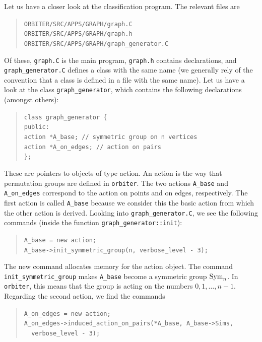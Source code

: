 Let us have a closer look at the classification program. The relevant 
files are
\begin{quote}
\verb'ORBITER/SRC/APPS/GRAPH/graph.C'\\
\verb'ORBITER/SRC/APPS/GRAPH/graph.h'\\
\verb'ORBITER/SRC/APPS/GRAPH/graph_generator.C'\\
\end{quote}
Of these, \verb'graph.C' is the main program, \verb'graph.h' contains declarations, 
and \verb'graph_generator.C' defines a class with the same name (we generally 
rely of the convention that a class is defined in a file with the same name).
Let us have a look at the class \verb'graph_generator', which contains the following 
declarations (amongst others):
\begin{quote}
\verb'class graph_generator {'\\
\verb'public:'\\
  \verb'action *A_base; // symmetric group on n vertices'\\
  \verb'action *A_on_edges; // action on pairs'\\
\verb'};'\\
\end{quote}
These are pointers to objects of type action. 
An action is the way that permutation groups are defined in \verb'orbiter'.
The two actions \verb'A_base' and \verb'A_on_edges' correspond to the action on points 
and on edges, respectively. The first action is called \verb'A_base' because we consider this the basic action from which the other action is derived.
Looking into \verb'graph_generator.C', we see the following commands (inside the function \verb'graph_generator::init'):
\begin{quote}
\verb'A_base = new action;'\\
\verb'A_base->init_symmetric_group(n, verbose_level - 3);'\\
\end{quote}
The new command allocates memory for the action object. The command 
\verb'init_symmetric_group' makes \verb'A_base' become a symmetric group ${\rm Sym}_n$.  
In \verb'orbiter', this means that the group is acting on the numbers 
$0,1,\ldots,n-1.$
Regarding the second action, we find the commands
\begin{quote}
\verb'A_on_edges = new action;'\\
\verb'A_on_edges->induced_action_on_pairs(*A_base, A_base->Sims,'\\
\verb'  verbose_level - 3);'\\
\end{quote}
